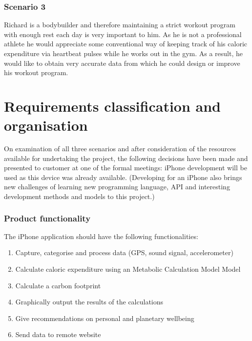 \documentclass[12pt, a4paper]{report}   %
\begin{document}
\begin{enumerate}
\subsubsection*{Scenario 3}
Richard is a bodybuilder and therefore maintaining a strict workout program with enough rest each day is very important to him. As he is not a professional athlete he would appreciate some conventional way of keeping track of his caloric expenditure via heartbeat pulses while he works out in the gym. As a result, he would like to obtain very accurate data from which he could design or improve his workout program.

\section{Requirements classification and \\ organisation}
On examination of all three scenarios and after consideration of the resources available for undertaking the project, the following decisions have been made and presented to customer at one of the formal meetings: iPhone development will be used as this device was already available. (Developing for an iPhone also brings new challenges of learning new programming language, API and interesting development methods and models to this project.)

\subsubsection*{Product functionality}

The iPhone application should have the following functionalities:

	\begin{enumerate}
	\item Capture, categorise and process data (GPS, sound signal, accelerometer)
	\item Calculate caloric expenditure using an Metabolic Calculation Model Model
	\item Calculate a carbon footprint
	\item Graphically output the results of the calculations
	\item Give recommendations on personal and planetary wellbeing
	\item Send data to remote website
	\end{enumerate}


\end{enumerate}
\end{document}
